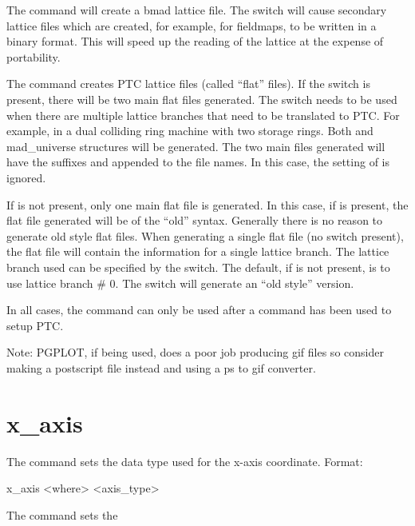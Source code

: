{{{{{{{{{The  command will create a bmad lattice file. The  switch
will cause secondary lattice files which are created, for example, for fieldmaps, to
be written in a binary format. This will speed up the reading of the lattice at the
expense of portability.

The  command creates PTC lattice files (called ``flat'' files).  If the
 switch is present, there will be two main flat files generated. The 
switch needs to be used when there are multiple lattice branches that need to be
translated to PTC. For example, in a dual colliding ring machine with two storage rings.
Both  and  mad_universe structures will be generated. The two main files
generated will have the suffixes  and  appended to the file names. In
this case, the setting of  is ignored.

If  is not present, only one main flat file is generated. In this case, if
 is present, the flat file generated will be of the ``old'' syntax. Generally
there is no reason to generate old style flat files. When generating a single flat file
(no  switch present), the flat file will contain the information for a single
lattice branch. The lattice branch used can be specified by the  switch. The
default, if  is not present, is to use lattice branch \# 0. The 
switch will generate an ``old style'' version.

In all cases, the  command can only be used after a  command
has been used to setup PTC.

Note: PGPLOT, if being used, does a poor job producing gif files so consider making a
postscript file instead and using a ps to gif converter.


\section{x_axis}
\label{s:x.axis}

The  command sets the data type used for the x-axis coordinate. Format:
\begin{example}
  x_axis <where> <axis_type>
\end{example}

\vskip 7pt 

The  command sets the \vn{plot%
for the horizontal axis. Possibilities for \vn{<axis_type>} are:
\begin{example}
  index     -- Use data index
  ele_index -- Use data element index
  s         -- Use longitudinal position.
\end{example}
Note that \vn{index} only makes sense for data that has an index associated with it.

}}}}}}}}}}

